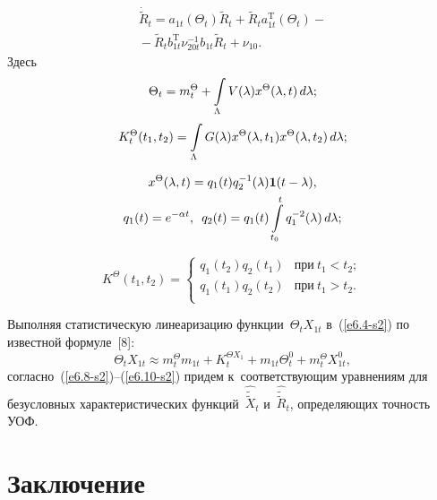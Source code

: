 \begin{multicols}{2}
\vspace*{-12pt}
  
\noindent
\begin{multline}
{\dot{\tilde R}}_t = a_{1t}(\Theta_t) \tilde R_t + \tilde R_t 
a_{1t}^{\mathrm{T}}(\Theta_t)-{}\\
{}-\tilde R_t b_{1t}^{\mathrm{T}} \nu_{20t}^{-1} b_{1t} \tilde R_t +\nu_{10}.
\label{e6.10-s2}
\end{multline}
Здесь
    $$
    \Theta_t = m_t^\Theta + \int\limits_\Lambda V(\lambda) x^\Theta (\lambda,t) \,d\lambda;
    $$
    $$
    K_t^\Theta (t_1, t_2) =\int\limits_\Lambda G(\lambda) x^\Theta (\lambda,t_1) x^\Theta 
(\lambda,t_2) \,d\lambda;
$$
    
\vspace*{-12pt}
    
    \noindent
    \begin{multline*}
    x^\Theta(\lambda,t) = q_1 (t) q_2^{-1} (\lambda) {\bf 1} (t-\lambda),\\
     q_1 (t) = 
e^{-\alpha t},\enskip q_2(t) = q_1 (t) \int\limits_{t_0}^t q_1^{-2} (\lambda)\, d\lambda;
\end{multline*}

\vspace*{-4pt}

\noindent
    $$
    K^\Theta (t_1, t_2) =\begin{cases}
    q_1(t_2) q_2 (t_1) &  \mbox{при}\  t_1<t_2;\\
    q_1(t_1) q_2 (t_2) &  \mbox{при}\  t_1>t_2.\\
\end{cases}
   $$


Выполняя статистическую линеаризацию функции~$\Theta_t X_{1t}$ в~(\ref{e6.4-s2}) по 
известной формуле~[8]:
\begin{equation*}
\Theta_t X_{1t} \approx m_t^\Theta m_{1t} + K_t^{\Theta X_1} 
+m_{1t}\Theta_t^0 + m_t^\Theta X_{1t}^0,
\end{equation*}
согласно~(\ref{e6.8-s2})--(\ref{e6.10-s2}) придем к~соответствующим уравнениям для безусловных 
характеристических функций~$\hat{\tilde{\tilde X}}_t$ и~$\hat{\tilde{\tilde R}}_t$, определяющих точ\-ность УОФ.

\vspace*{-4pt}


\section{Заключение}

\vspace*{-2pt}


\end{multicols}
